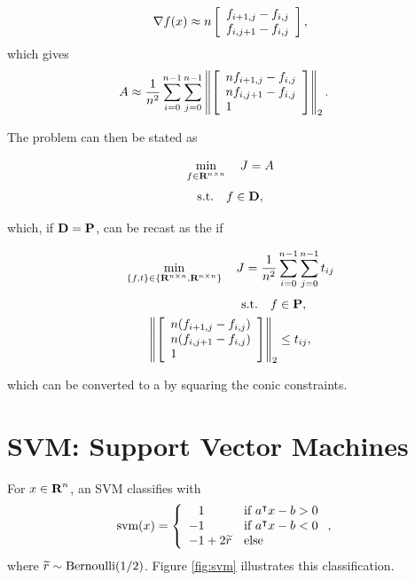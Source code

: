 \documentclass{article}
\begin{document}
    \begin{align*}
        \nabla f(x)\approx n \left[\begin{array}{lllllllllllllllllll}f_{i+1,j}-f_{i,j}\\f_{i,j+1}-f_{i,j}\end{array}\right],
    \end{align*}
    which gives
    \begin{align*}
        A&\approx\frac{1}{n^2}\sum_{i=0}^{n-1}\sum_{j=0}^{n-1}
        \left\|\left[\begin{array}{lllllllllllllllllll} nf_{i+1,j}-f_{i,j}\\ nf_{i,j+1}-f_{i,j} \\1\end{array}\right]\right\|_2.
    \end{align*}

    The problem can then be stated as

    \begin{align*}
        \min_{f\in\textbf{R}^{n\times n}}\quad J = A
    \end{align*}
    \begin{align*}
        \text{s.t.}\quad f\in\textbf{D},
    \end{align*}

    which, if $\textbf{D}=\textbf{P}$, can be recast as the \SOCP if 

    \begin{align*}
        \min_{\{f,t\}\in\{\textbf{R}^{n\times n},\textbf{R}^{n\times n}\}}\quad J = \frac{1}{n^2}\sum_{i=0}^{n-1}\sum_{j=0}^{n-1} t_{ij}
    \end{align*}
    \begin{align*}
        \text{s.t.}\quad f&\in\textbf{P},\\
        \left\|\left[\begin{array}{lllllllllllllllllll} n(f_{i+1,j}-f_{i,j})\\ n(f_{i,j+1}-f_{i,j}) \\1\end{array}\right]\right\|_2&\leq t_{ij},
    \end{align*}

    which can be converted to a \QCQP by squaring the conic constraints.\\


\clearpage

\section{SVM: Support Vector Machines}

    For $x\in\textbf{R}^n$, an SVM classifies with
    \begin{align*}
        \svm (x) &= \left\{
            \arr{ 
                \minus1 & \text{if $a^\tp x - b > 0$} \\ 
                -1 & \text{if $a^\tp x - b < 0$} \\                
                -1+2\rand{r} & \text{else} }
            \right.,
    \end{align*}
    where $\widetilde{r}\sim\text{Bernoulli}(1/2)$.
    Figure \ref{fig:svm} illustrates this classification. 
\end{document}
